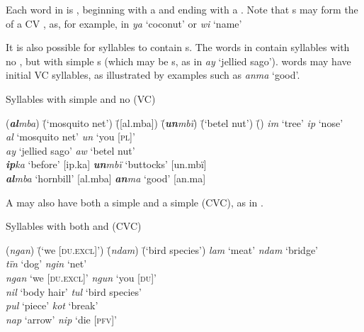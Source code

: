 Each word in  is , beginning with a  and ending with a . Note that s may form the  of a CV , as, for example, in \textit{ya}  ‘coconut’ or \textit{wi} ‘name’

It is also possible for syllables to contain s. The words in  contain syllables with no , but with simple s (which may be s, as in \textit{ay} ‘jellied sago’).  words may have initial VC syllables, as illustrated by examples such as \textit{anma} ‘good’.

\ea%
    \label{ex:phon:58}
          Syllables with simple  and no  (VC)\\
\begin{tabbing}
{(\textit{\textbf{al}mba})} \= {(‘mosquito net’)} \= {([al.mba])} \= {(\textit{\textbf{un}mbï})} \= {(‘betel nut’)} \= {()}\kill
{\textit{im}} \> {‘tree’} \> { } \> {\textit{ip}} \> {‘nose’} \> { }\\
{\textit{al}} \> {‘mosquito net’} \> { } \> {\textit{un}} \> {‘you [\textsc{pl}]’} \> { }\\
{\textit{ay}} \> {‘jellied sago’} \> { } \> {\textit{aw}} \> {‘betel nut’} \> { }\\
{\textit{\textbf{ip}ka}} \> {‘before’} \> {[ip.ka]} \> {\textit{\textbf{un}mbï}} \> {‘buttocks’} \> {[un.mbï]}\\
{\textit{\textbf{al}mba}} \> {‘hornbill’} \> {[al.mba]} \> {\textit{\textbf{an}ma}} \> {‘good’} \> {[an.ma]}
\end{tabbing}
\z

A  may also have both a simple  and a simple  (CVC), as in .

\ea%
    \label{ex:phon:59}
          Syllables with both  and  (CVC)
    \begin{tabbing}
    {(\textit{ngan})} \= {(‘we [\textsc{du.excl}]’)}   \=    {(\textit{ndam})} \= {(‘bird species’)}\kill
    \textit{lam}  \> ‘meat’     \>       \textit{ndam} \> ‘bridge’\\
 \textit{tïn}  \>  ‘dog’     \>       \textit{ngin} \> ‘net’\\
 \textit{ngan} \> ‘we [\textsc{du.excl}]’   \>    \textit{ngun} \> ‘you [\textsc{du}]’\\
 \textit{nil}  \>  ‘body hair’   \>     \textit{tul}  \>  ‘bird species’\\
 \textit{pul}  \>  ‘piece’      \>      \textit{kot}  \>  ‘break’\\
 \textit{nap} \> ‘arrow’    \>      \textit{nip}  \>  ‘die [\textsc{pfv}]’\\
 \end{tabbing}
\z

